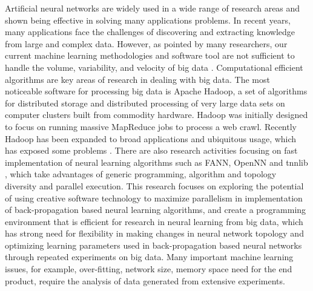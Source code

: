 \documentclass[procedia]{easychair}
\begin{document}
Artificial neural networks are widely used in a wide range of research areas and shown being effective in solving many applications problems.  In recent years, many applications face the challenges of discovering and extracting knowledge from large and complex data.  However, as pointed by many researchers, our current machine learning methodologies and software tool are not sufficient to handle the volume, variability, and velocity of big data \cite{fan2013mining, labrinidis2012challenges}.  Computational efficient algorithms are key areas of research in dealing with big data.  The most noticeable software for processing big data is Apache Hadoop, a set of algorithms for distributed storage and distributed processing of very large data sets on computer clusters built from commodity hardware.  Hadoop was initially designed to focus on running massive MapReduce jobs to process a web crawl.  Recently Hadoop has been expanded to broad applications and ubiquitous usage, which has exposed some problems \cite{vavilapalli2013apache}.  There are also research activities focusing on fast implementation of neural learning algorithms such as FANN, OpenNN and tnnlib \cite{nissen2003implementation, lopezopennn}, which take advantages of generic programming, algorithm and topology diversity and parallel execution. This research focuses on exploring the potential of using creative software technology to maximize parallelism in implementation of back-propagation based neural learning algorithms, and create a programming environment that is efficient for research in neural learning from big data, which has strong need for flexibility in making changes in neural network topology and optimizing learning parameters used in back-propagation based neural networks through repeated experiments on big data.  Many important machine learning issues, for example, over-fitting, network size, memory space need for the end product, require the analysis of data generated from extensive experiments.
\end{document}
